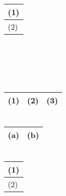 \documentclass[twocolumn, 20pt]{jarticle}
\begin{document}
\section{}
\begin{tabular}{|p{}|}
  \hline
  \\[20pt]
  \hline
\end{tabular}

\section{}
\begin{tabular}{|p{}|}
    \hline
    (1)\\[20pt]
    \hline
    (2)\\[20pt]
    \hline
\end{tabular}

\section{}
\begin{tabular}{|p{}|}
    \hline
    \\[20pt]
    \hline
\end{tabular}

\section{}
\begin{tabular}{|p{}|}
    \hline
    \\[20pt]
    \hline
\end{tabular}

\section{}
\begin{tabular}{|p{}|p{}|p{}|}
  \hline
  (1)&(2)&(3)\\[20pt]
  \hline
\end{tabular}

\section{}
\begin{tabular}{|p{}|p{}|}
    \hline
    (a)&(b)\\[20pt]
    \hline
\end{tabular}

\section{}
\begin{tabular}{|p{}|}
    \hline
    (1)\\[20pt]
    \hline
    (2)\\[20pt]
    \hline
\end{tabular}
\end{document}
